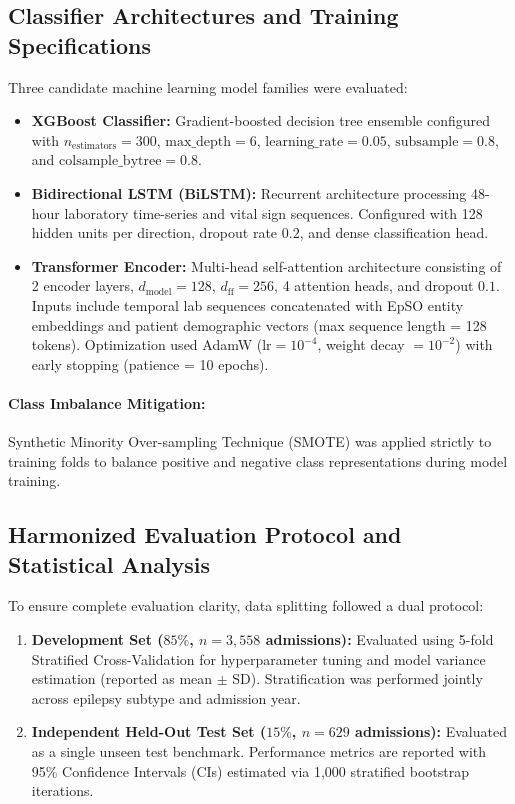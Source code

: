 \documentclass[11pt,a4paper]{article}
\begin{document}
\subsection{Classifier Architectures and Training Specifications}
Three candidate machine learning model families were evaluated:
\begin{itemize}[leftmargin=*, itemsep=0.3em]
    \item \textbf{XGBoost Classifier:} Gradient-boosted decision tree ensemble \cite{chen2016xgboost} configured with $n_{\text{estimators}} = 300$, $\text{max\_depth} = 6$, $\text{learning\_rate} = 0.05$, $\text{subsample} = 0.8$, and $\text{colsample\_bytree} = 0.8$.
    \item \textbf{Bidirectional LSTM (BiLSTM):} Recurrent architecture \cite{hochreiter1997long} processing 48-hour laboratory time-series and vital sign sequences. Configured with 128 hidden units per direction, dropout rate $0.2$, and dense classification head.
    \item \textbf{Transformer Encoder:} Multi-head self-attention architecture \cite{vaswani2017attention} consisting of 2 encoder layers, $d_{\text{model}} = 128$, $d_{\text{ff}} = 256$, 4 attention heads, and dropout $0.1$. Inputs include temporal lab sequences concatenated with EpSO entity embeddings and patient demographic vectors (max sequence length = 128 tokens). Optimization used AdamW ($\text{lr} = 10^{-4}$, weight decay $= 10^{-2}$) with early stopping (patience = 10 epochs).
\end{itemize}

\paragraph{Class Imbalance Mitigation:} Synthetic Minority Over-sampling Technique (SMOTE) \cite{chawla2002smote} was applied strictly to training folds to balance positive and negative class representations during model training.

\subsection{Harmonized Evaluation Protocol and Statistical Analysis}
To ensure complete evaluation clarity, data splitting followed a dual protocol:
\begin{enumerate}[label=(\arabic*)]
    \item \textbf{Development Set ($85\%$, $n = 3,558$ admissions):} Evaluated using 5-fold Stratified Cross-Validation for hyperparameter tuning and model variance estimation (reported as mean $\pm$ SD). Stratification was performed jointly across epilepsy subtype and admission year.
    \item \textbf{Independent Held-Out Test Set ($15\%$, $n = 629$ admissions):} Evaluated as a single unseen test benchmark. Performance metrics are reported with 95\% Confidence Intervals (CIs) estimated via 1,000 stratified bootstrap iterations.
\end{enumerate}
\end{document}
